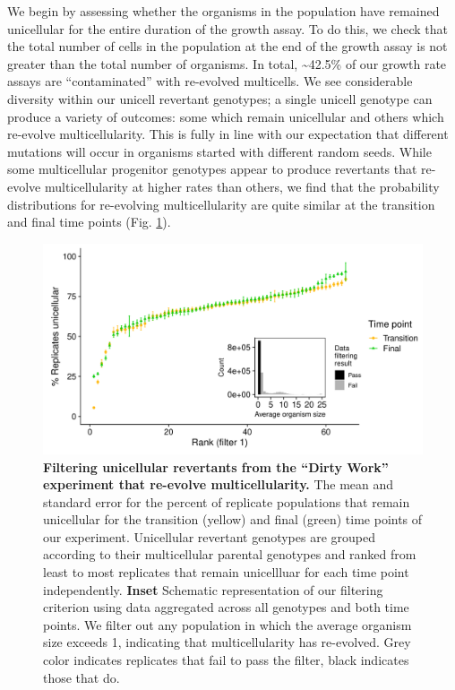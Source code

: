 \documentclass[
]{book}
\begin{document}
We begin by assessing whether the organisms in the population have remained unicellular for the entire duration of the growth assay. To do this, we check that the total number of cells in the population at the end of the growth assay is not greater than the total number of organisms. In total, \textasciitilde42.5\% of our growth rate assays are ``contaminated'' with re-evolved multicells. We see considerable diversity within our unicell revertant genotypes; a single unicell genotype can produce a variety of outcomes: some which remain unicellular and others which re-evolve multicellularity. This is fully in line with our expectation that different mutations will occur in organisms started with different random seeds. While some multicellular progenitor genotypes appear to produce revertants that re-evolve multicellularity at higher rates than others, we find that the probability distributions for re-evolving multicellularity are quite similar at the transition and final time points (Fig. \ref{fig:dw-filter-1-reevolving-multicellularity}).

\begin{figure}
\centering
\includegraphics{images/Figure_S4_Dirty_work_Populations_that_re-evolve_multicellularity_NEW_14MAR23.png}
\caption{\label{fig:dw-filter-1-reevolving-multicellularity}\textbf{Filtering unicellular revertants from the ``Dirty Work'' experiment that re-evolve multicellularity.} The mean and standard error for the percent of replicate populations that remain unicellular for the transition (yellow) and final (green) time points of our experiment. Unicellular revertant genotypes are grouped according to their multicellular parental genotypes and ranked from least to most replicates that remain unicellluar for each time point independently. \textbf{Inset} Schematic representation of our filtering criterion using data aggregated across all genotypes and both time points. We filter out any population in which the average organism size exceeds 1, indicating that multicellularity has re-evolved. Grey color indicates replicates that fail to pass the filter, black indicates those that do.}
\end{figure}
\end{document}
